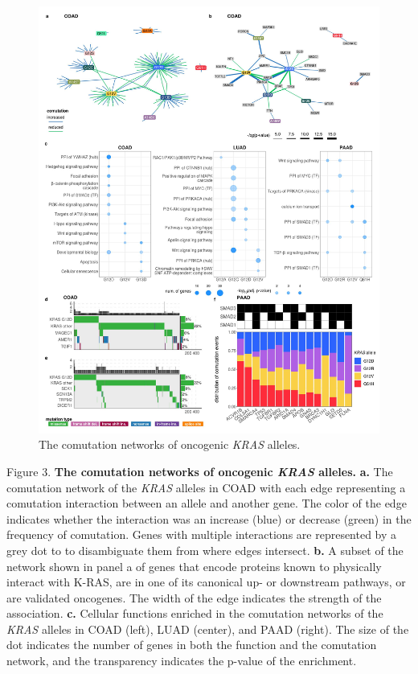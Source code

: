 \documentclass[english, 10pt, letterpaper]{article}
\newcommand{\KRAS}{\emph{KRAS}}
\newcommand{\kras}{K-RAS}
\begin{document}
\begin{figure}[h!]
\centering
\includegraphics[width=176mm]{figures/Fig_3.jpeg}
\caption{The comutation networks of oncogenic \KRAS{} alleles.}
\label{fig:comutation-main}
\end{figure}
\newpage
\noindent Figure 3. \textbf{The comutation networks of oncogenic \KRAS{} alleles.}
\textbf{a.} The comutation network of the \KRAS{} alleles in COAD with each edge representing a comutation interaction between an allele and another gene. The color of the edge indicates whether the interaction was an increase (blue) or decrease (green) in the frequency of comutation. Genes with multiple interactions are represented by a grey dot to to disambiguate them from where edges intersect.
\textbf{b.} A subset of the network shown in panel a of genes that encode proteins known to physically interact with \kras{}, are in one of its canonical up- or downstream pathways, or are validated oncogenes. The width of the edge indicates the strength of the association.
\textbf{c.} Cellular functions enriched in the comutation networks of the \KRAS{} alleles in COAD (left), LUAD (center), and PAAD (right). The size of the dot indicates the number of genes in both the function and the comutation network, and the transparency indicates the p-value of the enrichment.
\end{document}

